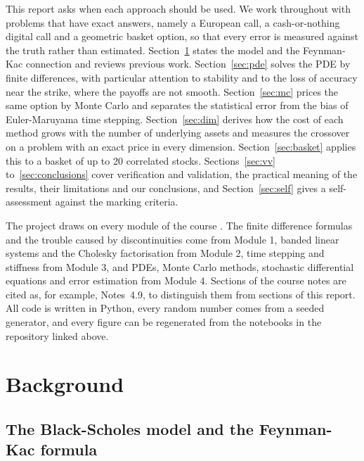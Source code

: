 \documentclass[11pt,a4paper]{article}
\begin{document}
This report asks when each approach should be used. We work throughout with problems that have exact answers, namely a European call, a cash-or-nothing digital call and a geometric basket option, so that every error is measured against the truth rather than estimated. Section~\ref{sec:background} states the model and the Feynman-Kac connection and reviews previous work. Section~\ref{sec:pde} solves the PDE by finite differences, with particular attention to stability and to the loss of accuracy near the strike, where the payoffs are not smooth. Section~\ref{sec:mc} prices the same option by Monte Carlo and separates the statistical error from the bias of Euler-Maruyama time stepping. Section~\ref{sec:dim} derives how the cost of each method grows with the number of underlying assets and measures the crossover on a problem with an exact price in every dimension. Section~\ref{sec:basket} applies this to a basket of up to 20 correlated stocks. Sections~\ref{sec:vv} to~\ref{sec:conclusions} cover verification and validation, the practical meaning of the results, their limitations and our conclusions, and Section~\ref{sec:self} gives a self-assessment against the marking criteria.

The project draws on every module of the course \citep{notes2026}. The finite difference formulas and the trouble caused by discontinuities come from Module 1, banded linear systems and the Cholesky factorisation from Module 2, time stepping and stiffness from Module 3, and PDEs, Monte Carlo methods, stochastic differential equations and error estimation from Module 4. Sections of the course notes are cited as, for example, Notes~4.9, to distinguish them from sections of this report. All code is written in Python, every random number comes from a seeded generator, and every figure can be regenerated from the notebooks in the repository linked above.

\section{Background}\label{sec:background}

\subsection{The Black-Scholes model and the Feynman-Kac formula}
\end{document}
